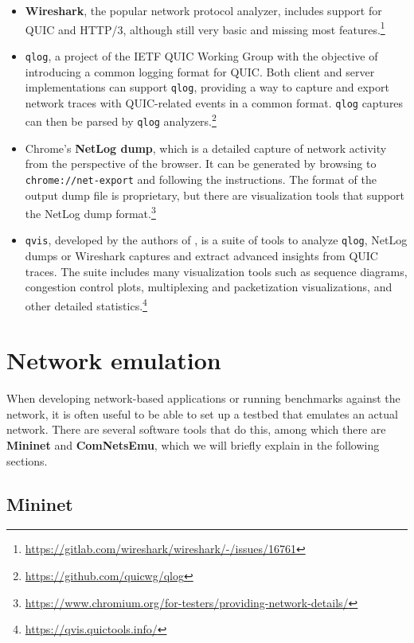 \begin{itemize}
    \item \textbf{Wireshark}, the popular network protocol analyzer, includes support for QUIC and HTTP/3, although still very basic and missing most features.\footnote{\url{https://gitlab.com/wireshark/wireshark/-/issues/16761}}
    \item \texttt{qlog}, a project of the IETF QUIC Working Group with the objective of introducing a common logging format for QUIC. Both client and server implementations can support \texttt{qlog}, providing a way to capture and export network traces with QUIC-related events in a common format. \texttt{qlog} captures can then be parsed by \texttt{qlog} analyzers.\footnote{\url{https://github.com/quicwg/qlog}}
    \item Chrome's \textbf{NetLog dump}, which is a detailed capture of network activity from the perspective of the browser. It can be generated by browsing to \texttt{chrome://net-export} and following the instructions. The format of the output dump file is proprietary, but there are visualization tools that support the NetLog dump format.\footnote{\url{https://www.chromium.org/for-testers/providing-network-details/}}
    \item \texttt{qvis}, developed by the authors of \cite{quicdiversity}, is a suite of tools to analyze \texttt{qlog}, NetLog dumps or Wireshark captures and extract advanced insights from QUIC traces. The suite includes many visualization tools such as sequence diagrams, congestion control plots, multiplexing and packetization visualizations, and other detailed statistics.\footnote{\url{https://qvis.quictools.info/}}
\end{itemize}

\section{Network emulation}
\label{sec:bg/network}

When developing network-based applications or running benchmarks against the network, it is often useful to be able to set up a testbed that emulates an actual network. There are several software tools that do this, among which there are \textbf{Mininet} and \textbf{ComNetsEmu}, which we will briefly explain in the following sections.

\subsection{Mininet}
\label{sec:bg/network/mininet}

